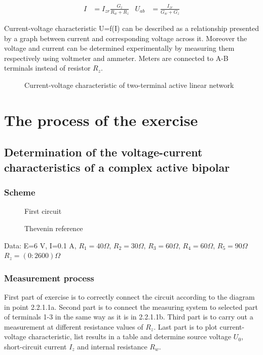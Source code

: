 \documentclass[]{scrartcl}
\begin{document}
\begin{align}
I&=I_{zr}\frac{G_{z}}{R_{w}+R_{z}} & U_{ab}&=\frac{I_{zr}}{G_w+G_z}
\end{align}

Current-voltage characteristic U=f(I) can be described as a relationship presented by a graph between current and corresponding voltage across it. Moreover the voltage and current can be determined experimentally by measuring them respectively using voltmeter and ammeter. Meters are connected to A-B terminals instead of resistor $R_z$.

\begin{figure}[H]
	\centering
	
	\caption{Current-voltage characteristic of two-terminal active linear network}
	\label{fig:current-voltage characteristic}
\end{figure}

\section{The process of the exercise}

\subsection{Determination of the voltage-current characteristics of a complex active bipolar}
\subsubsection{Scheme}

\begin{figure}[H]
	\centering
	 
	\caption{First circuit}
	\label{fig:first_circuit}
\end{figure}

\begin{figure}[H]
	\centering
	
	\caption{Thevenin reference}
	\label{fig:thevenin_reference}
\end{figure}

Data: E=6 V, I=0.1 A, $R_1=40\Omega$, $R_2=30\Omega$, $R_3=60\Omega$, $R_4=60\Omega$, $R_5=90\Omega$ $R_z=(0:2600)\Omega$

\subsubsection{Measurement process}

First part of exercise is to correctly connect the circuit according to the diagram in point 2.2.1.1a. Second part is to connect the measuring system to selected part of terminals 1-3 in the same way as it is in 2.2.1.1b. Third part is to carry out a measurement at different resistance values of $R_z$. Last part is to plot current-voltage characteristic, list results in a table and determine source voltage $U_0$, short-circuit current $I_z$ and internal resistance $R_w$. 
\end{document}
